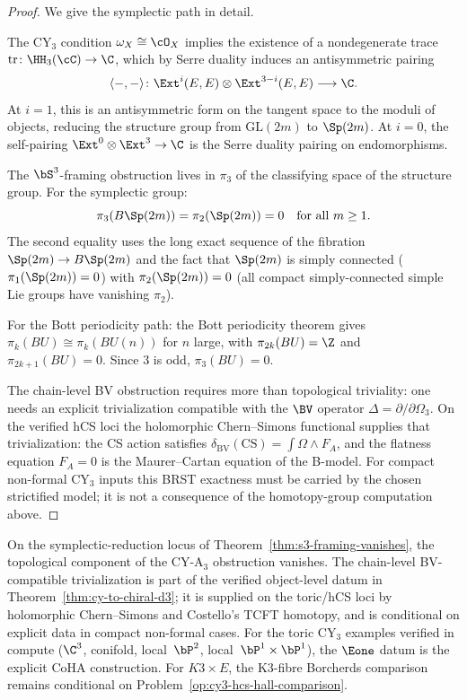 \begin{proof}
We give the symplectic path in detail.

The CY$_3$ condition $\omega_X \cong \cO_X$ implies the existence of a nondegenerate trace $\mathrm{tr} \colon \HH_3(\cC) \to \C$, which by Serre duality induces an antisymmetric pairing
\[
 \langle -, - \rangle \colon \Ext^i(E, E) \otimes \Ext^{3-i}(E, E) \longrightarrow \C.
\]
At $i = 1$, this is an antisymmetric form on the tangent space to the moduli of objects, reducing the structure group from $\mathrm{GL}(2m)$ to $\Sp(2m)$. At $i = 0$, the self-pairing $\Ext^0 \otimes \Ext^3 \to \C$ is the Serre duality pairing on endomorphisms.

The $\bS^3$-framing obstruction lives in $\pi_3$ of the classifying space of the structure group. For the symplectic group:
\[
 \pi_3(B\Sp(2m)) = \pi_2(\Sp(2m)) = 0 \quad \text{for all } m \geq 1.
\]
The second equality uses the long exact sequence of the fibration $\Sp(2m) \to B\Sp(2m)$ and the fact that $\Sp(2m)$ is simply connected ($\pi_1(\Sp(2m)) = 0$) with $\pi_2(\Sp(2m)) = 0$ (all compact simply-connected simple Lie groups have vanishing $\pi_2$).

For the Bott periodicity path: the Bott periodicity theorem gives $\pi_k(BU) \cong \pi_k(BU(n))$ for $n$ large, with $\pi_{2k}(BU) = \Z$ and $\pi_{2k+1}(BU) = 0$. Since $3$ is odd, $\pi_3(BU) = 0$.

The chain-level BV obstruction requires more than topological
triviality: one needs an explicit trivialization compatible with the
$\BV$ operator $\Delta = \partial/\partial \Omega_3$. On the verified
hCS loci the holomorphic Chern--Simons functional supplies that
trivialization: the CS action satisfies
$\delta_{\mathrm{BV}}(\mathrm{CS}) = \int \Omega \wedge F_A$, and the
flatness equation $F_A = 0$ is the Maurer--Cartan equation of the
B-model. For compact non-formal CY$_3$ inputs this BRST exactness must
be carried by the chosen strictified model; it is not a consequence of
the homotopy-group computation above.
\end{proof}


\begin{corollary}
\label{cor:cya3-no-topological-obstruction}
On the symplectic-reduction locus of Theorem~\ref{thm:s3-framing-vanishes},
the topological component of the CY-A$_3$ obstruction vanishes. The
chain-level BV-compatible trivialization is part of the verified
object-level datum in Theorem~\ref{thm:cy-to-chiral-d3}; it is supplied
on the toric/hCS loci by holomorphic Chern--Simons and Costello's TCFT
homotopy, and is conditional on explicit data in compact
non-formal cases. For the toric CY$_3$ examples verified in compute
($\C^3$, conifold, local~$\bP^2$, local~$\bP^1 \times \bP^1$), the
$\Eone$ datum is the explicit CoHA construction. For $K3 \times E$,
the K3-fibre Borcherds comparison remains conditional on
Problem~\ref{op:cy3-hcs-hall-comparison}.
\end{corollary}


